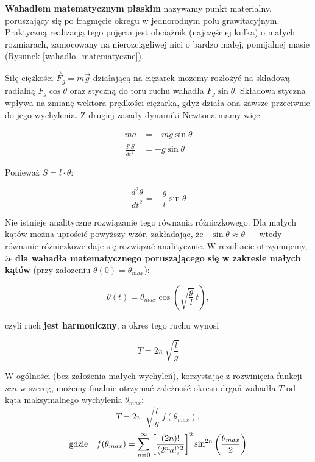 \documentclass[a4paper]{article}
\begin{document}
\textbf{Wahadłem matematycznym płaskim} nazywamy punkt materialny, poruszający się po
fragmęcie okregu w jednorodnym polu grawitacyjnym. Praktyczną realizacją tego pojęcia
jest obciążnik (najczęściej kulka) o małych rozmiarach, zamocowany na nierozciągliwej
nici o bardzo małej, pomijalnej masie (Rysunek \ref{wahadlo_matematyczne}).


Siłę ciężkości $\vec{F}_g = m\vec{g}$ działającą na ciężarek możemy rozłożyć na
składową radialną $F_g \cos \theta$ oraz styczną do toru ruchu wahadła $F_g \sin \theta$.
Składowa styczna wpływa na zmianę wektora prędkości ciężarka, gdyż działa ona
zawsze przeciwnie do jego wychylenia. Z drugiej zasady dynamiki Newtona mamy więc:

\begin{align*}
 ma &= -mg\sin\theta \\
 \frac{d^2S}{dt^2} &= -g\sin\theta
\end{align*}

Ponieważ $S = l \cdot \theta$:

\[ \frac{d^2\theta}{dt^2} = -\frac{g}{l}\sin\theta \]


Nie istnieje analityczne rozwiązanie tego równania różniczkowego. Dla małych kątów
można uprościć powyższy wzór, zakładając, że \, $\sin\theta \approx \theta$ \,
-- wtedy równanie różniczkowe daje się rozwiązać analitycznie. W rezultacie otrzymujemy,
że \textbf{dla wahadła matematycznego poruszającego się w zakresie małych kątów}
(przy założeniu $\theta(0) = \theta_{max}$):

\[ \theta(t) = \theta_{max}\cos\left(\sqrt{\frac{g}{l}}\,t\right), \]

czyli ruch \textbf{jest harmoniczny}, a okres tego ruchu wynosi

\[ T = 2\pi~\sqrt{\frac{l}{g}} \]


W ogólności (bez założenia małych wychyleń), korzystając z rozwinięcia funkcji $sin$
w szereg, możemy finalnie otrzymać zależność okresu drgań wahadła $T$ od kąta
maksymalnego wychylenia $\theta_{max}$:
\begin{equation} \label{eq:T}
T = 2\pi ~ \sqrt[]{\frac{l}{g}}~f(\theta_{max}) ,
\end{equation}
\begin{equation} \label{eq:f}
\text{gdzie} \enskip  \enskip f(\theta_{max}) = 
	\sum\limits_{n=0}^{\infty} 
		\left[ \frac{(2n)!}{(2^nn!)^2} \right]^2 
			\sin^{2n}\left(\frac{\theta_{max}}{2} \right)
\end{equation}
\end{document}
